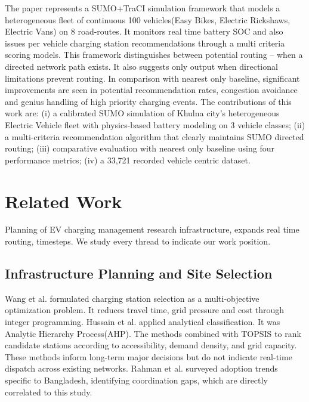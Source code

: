 \documentclass[conference]{IEEEtran}
\begin{document}
The paper represents a SUMO+TraCI simulation framework that models a
heterogeneous fleet of continuous 100 vehicles(Easy Bikes, Electric
Rickshaws, Electric Vans) on 8 road-routes. It monitors real time
battery SOC and also issues per vehicle charging station recommendations
through a multi criteria scoring models. This framework distinguishes
between potential routing -- when a directed network path exists. It
also suggests only output when directional limitations prevent routing.
In comparison with nearest only baseline, significant improvements are
seen in potential recommendation rates, congestion avoidance and genius
handling of high priority charging events. The contributions of this
work are: (i) a calibrated SUMO simulation of Khulna city's
heterogeneous Electric Vehicle fleet with physics-based battery modeling
on 3 vehicle classes; (ii) a multi-criteria recommendation algorithm
that clearly maintains SUMO directed routing; (iii) comparative
evaluation with nearest only baseline using four performance metrics;
(iv) a 33,721 recorded vehicle centric dataset.

\section{Related Work}

Planning of EV charging management research infrastructure, expands
real time routing, timesteps. We study every thread to indicate our
work position.

\subsection{Infrastructure Planning and Site Selection}

Wang et al. \cite{b2} formulated charging station selection as a
multi-objective optimization problem. It reduces travel time, grid
pressure and cost through integer programming. Hussain et al. \cite{b6}
applied analytical classification. It was Analytic Hierarchy
Process(AHP). The methods combined with TOPSIS to rank candidate
stations according to accessibility, demand density, and grid capacity.
These methods inform long-term major decisions but do not indicate
real-time dispatch across existing networks. Rahman et al. \cite{b1}
surveyed adoption trends specific to Bangladesh, identifying
coordination gaps, which are directly correlated to this study.
\end{document}
